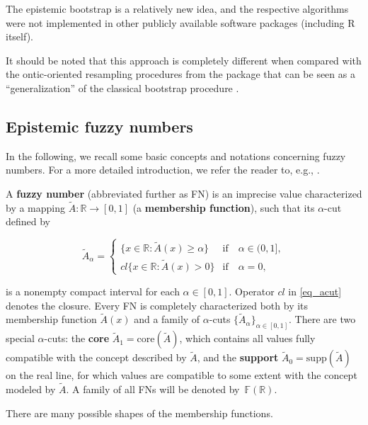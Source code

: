 The epistemic bootstrap is a relatively new idea, and the respective algorithms were not implemented in other publicly available software packages (including R itself).

It should be noted that this approach is completely different when compared with the ontic-oriented resampling procedures from the  package that can be seen as a ``generalization'' of the classical bootstrap procedure \citep{grzegorzewski_amcs2020,GrzegorzewskiRom2021}.


\subsection{Epistemic fuzzy numbers}

In the following, we recall some basic concepts and notations concerning fuzzy numbers. For a more detailed introduction, we refer the reader to, e.g., \cite{ban_coroianu_pg}.

A \textbf{fuzzy number} (abbreviated further as FN) is an imprecise value characterized by a mapping $\tilde{A}:\mathbb{R}\to [0,1]$ (a \textbf{membership function}), such that its $\alpha$-cut defined by

\begin{equation}
\tilde{A}_{\alpha}=\begin{cases}
\{x\in\mathbb{R}:\tilde{A}(x)\geqslant\alpha\} & \text{if}\quad \alpha\in (0,1], \\
cl\{x\in\mathbb{R}:\tilde{A}(x)>0\} & \text{if}\quad \alpha=0,
\end{cases} \label{eq_acut}
\end{equation}

is a nonempty compact interval for each $\alpha\in [0,1]$. Operator $cl$ in \eqref{eq_acut} denotes the closure. Every FN is completely characterized both by its membership function $\tilde{A}(x)$ and a family of $\alpha$-cuts $\{\tilde{A}_{\alpha}\}_{\alpha\in [0,1]}$. There are two special $\alpha$-cuts: the \textbf{core} $\tilde{A}_1=\mathrm{core}(\tilde{A})$, which contains all values fully compatible with the concept described by $\tilde{A}$, and the \textbf{support} $\tilde{A}_0=\mathrm{supp}(\tilde{A})$ on the real line, for which values are compatible to some extent with the concept modeled by $\tilde{A}$. A family of all FNs will be denoted by~$\mathbb{F}(\mathbb{R})$.

There are many possible shapes of the membership functions.

